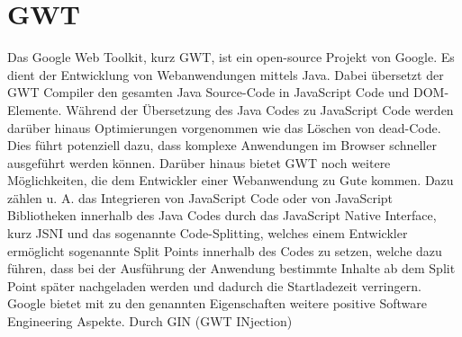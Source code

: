 \section{GWT}
\label{GWT}
Das Google Web Toolkit, kurz GWT, ist ein open-source Projekt von Google. Es
dient der Entwicklung von Webanwendungen mittels Java. Dabei übersetzt der GWT
Compiler den gesamten Java Source-Code in JavaScript Code und DOM-Elemente.
Während der Übersetzung des Java Codes zu JavaScript Code werden darüber hinaus Optimierungen vorgenommen wie das Löschen von dead-Code. Dies führt potenziell dazu, dass komplexe
Anwendungen im Browser schneller ausgeführt werden können. Darüber hinaus bietet
GWT noch weitere Möglichkeiten, die dem Entwickler einer Webanwendung zu Gute
kommen. Dazu zählen u. A. das Integrieren von JavaScript Code oder von
JavaScript Bibliotheken innerhalb des Java Codes durch das JavaScript Native
Interface, kurz JSNI und das sogenannte Code-Splitting, welches einem Entwickler
ermöglicht sogenannte Split Points innerhalb des Codes zu setzen, welche dazu
führen, dass bei der Ausführung der Anwendung bestimmte Inhalte ab dem Split
Point später nachgeladen werden und dadurch die Startladezeit verringern.
Google bietet mit zu den genannten Eigenschaften weitere positive
Software Engineering Aspekte. Durch GIN (GWT INjection) 
